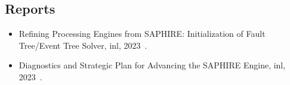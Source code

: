 \subsection{Reports}
\begin{itemize}
    \item {Refining Processing Engines from SAPHIRE: Initialization of Fault Tree/Event Tree Solver, \acrshort{inl}, 2023~\cite{aras_refining_2023}.}
    \item {Diagnostics and Strategic Plan for Advancing the SAPHIRE Engine, \acrshort{inl}, 2023~\cite{aras_diagnostics_2023}.}
\end{itemize}